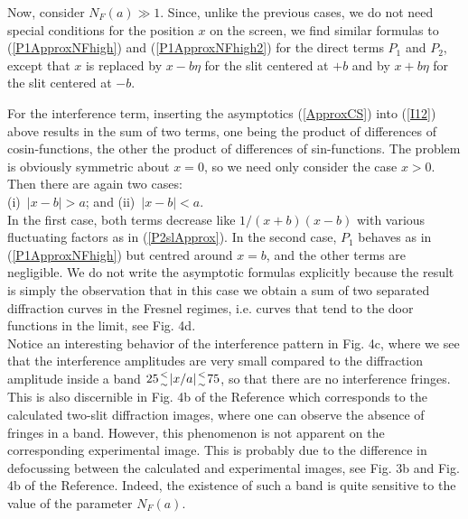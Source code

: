 \documentclass[12pt,aps,prb,preprint]{revtex4-1}   %
\begin{document}
Now, consider $N_F(a)\gg 1$. Since, unlike the previous cases, we
do not need special conditions for the position $x$ on the screen,
we find similar formulas to (\ref{P1ApproxNFhigh}) and
(\ref{P1ApproxNFhigh2}) for the direct terms $P_1$ and $P_2$,
except that $x$ is replaced by $x-b\eta$ for the slit centered at
$+b$ and by $x+b\eta$ for the slit centered at $-b$.

For the interference term, inserting the asymptotics (\ref{ApproxCS})
into (\ref{I12}) above results in the sum of two terms, one being
the product of differences of cosin-functions, the other the product
of differences of sin-functions. The problem is obviously
symmetric about $x=0$, so we need only
consider the case $x>0$. Then there are again two cases: \\
(i)\ $|x-b| > a$; and (ii)\ $|x-b| < a$. \\
In the first case, both terms decrease like $1/(x+b)(x-b)$ with
various fluctuating factors as in (\ref{P2slApprox}). In the
second case, $P_1$ behaves as in (\ref{P1ApproxNFhigh}) but
centred around $x=b$, and the other terms are negligible. We do
not write the asymptotic formulas explicitly because the result is
simply the observation that in this case we obtain a sum of two
separated diffraction curves in the Fresnel regimes,
i.e. curves that tend to the door functions in the limit, see Fig. 4d.\\

Notice an interesting behavior of the interference pattern in Fig.
4c, where we see that the interference amplitudes are very small
compared to the diffraction amplitude inside a band $25 {< \atop
\sim} |x/a| {< \atop \sim} 75$, so that there are no interference
fringes. This is also discernible in Fig. 4b of the Reference\cite{Frabboni}
which corresponds to the calculated two-slit diffraction images,
where one can observe the absence of fringes in a band. However,
this phenomenon is not apparent on the corresponding experimental
image. This is probably due to the difference in defocussing
between the calculated and experimental images, see Fig. 3b and
Fig. 4b of the Reference.\cite{Frabboni} Indeed, the existence of such a band
is quite sensitive to the value of the parameter $N_F(a)$.
\end{document}
